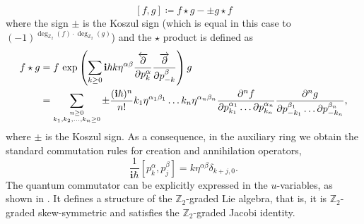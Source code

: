 \documentclass{amsart}
\numberwithin{equation}{section} %
\theoremstyle{plain}
\theoremstyle{remark}
\def\cxi{\mathbf{i}}
\begin{document}
\begin{equation}
\label{eqn: quantum commutator}
    [f,g] \coloneqq f\star g - \pm g\star f
\end{equation}
where the sign $\pm$ is the Koszul sign (which is equal in this case to $(-1)^{\deg_{\mathbb{Z}_2} (f) \cdot \deg_{\mathbb{Z}_2} (g)}$) and the $\star$ product is defined as
\begin{align*}
f\star g &=f \  \mathrm{exp}\left(\sum _{k\geq 0} \cxi\hbar k\eta ^{\alpha \beta }{\frac{\overleftarrow\partial }{\partial p_{k}^{\alpha }}}{\frac{\overrightarrow\partial }{\partial p_{-k}^{\beta }}}\right)  g \\
& =\sum _{ \footnotesize \substack{n\geq 0 \\ k_{1} ,k_{2} ,\ldots ,k_{n} \geq 0}}\pm \frac{( \cxi\hbar ){^{n}}}{n!} k_{1} \eta ^{\alpha _{1} \beta _{1}} \ldots k_{n} \eta ^{\alpha _{n} \beta _{n}}\frac{\partial ^{n} f}{\partial p_{k_{1}}^{\alpha _{1}} \ldots \partial p_{k_{n}}^{\alpha _{n}}}\frac{\partial ^{n} g}{\partial p_{-k_{1}}^{\beta _{1}} \ldots \partial p_{-k_{n}}^{\beta _{n}}},
\end{align*}
where $\pm$ is the Koszul sign. 
As a consequence, in the auxiliary ring we obtain the standard commutation rules for creation and annihilation operators,
\begin{equation*}
    \frac{1}{\cxi\hbar}[p^{\alpha}_{k},p^{\beta}_j] = k\eta^{\alpha \beta}\delta_{k+j,0}.
\end{equation*}
The quantum commutator can be explicitly expressed in the $u$-variables, as shown in \cite{buryak_rossi_15}. It defines a structure of the $\mathbb{Z}_2$-graded Lie algebra, that is, it is $\mathbb{Z}_2$-graded skew-symmetric and satisfies the $\mathbb{Z}_2$-graded Jacobi identity. 
﻿
﻿
\end{document}
